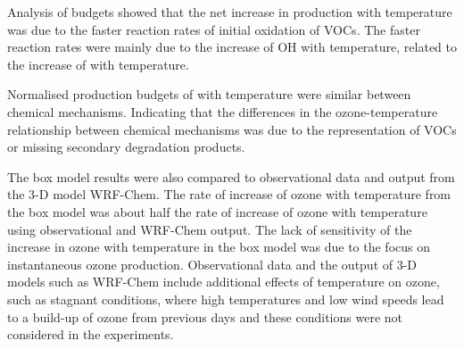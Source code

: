 Analysis of  budgets showed that the net increase in  production with temperature was due to the faster reaction rates of initial oxidation of VOCs.
The faster reaction rates were mainly due to the increase of OH with temperature, related to the increase of  with temperature.

Normalised production budgets of  with temperature were similar between chemical mechanisms.
Indicating that the differences in the ozone-temperature relationship between chemical mechanisms was due to the representation of VOCs or missing secondary degradation products.

The box model results were also compared to observational data and output from the 3-D model WRF-Chem.
The rate of increase of ozone with temperature from the box model was about half the rate of increase of ozone with temperature using observational and WRF-Chem output.
The lack of sensitivity of the increase in ozone with temperature in the box model was due to the focus on instantaneous ozone production.
Observational data and the output of 3-D models such as WRF-Chem include additional effects of temperature on ozone, such as stagnant conditions, where high temperatures and low wind speeds lead to a build-up of ozone from previous days and these conditions were not considered in the experiments.
